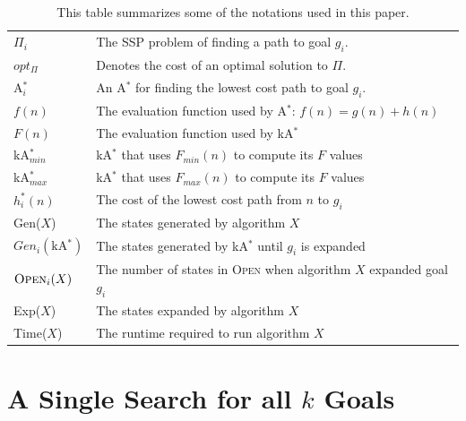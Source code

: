 \documentclass{aicom2e}
\newcommand{\astar}{A$^*$}
\newcommand{\kastar}{kA$^*$}
\newcommand{\kastarmin}{kA$^*_{min}$}
\newcommand{\kastarmax}{kA$^*_{max}$}
\newcommand{\astari}[1]{A$^*_#1$}
\newcommand{\minf}{$F_{min}(n)$}
\newcommand{\maxf}{$F_{max}(n)$}
\newcommand{\open}{\textsc{Open}}
\begin{document}
\begin{table}
    \scriptsize
\begin{tabular}{|m{1cm}|m{5.5cm}|}
        \hline
        $\Pi_i$     & The SSP problem of finding a path to goal $g_i$. \\
        $opt_\Pi$   & Denotes the cost of an optimal solution to $\Pi$.\\
        \astari{i}  & An \astar{} for finding the lowest cost path to goal $g_i$. \\
        $f(n)$      & The evaluation function used by \astar{}: $f(n)=g(n)+h(n)$ \\
        $F(n)$      & The evaluation function used by \kastar{} \\

        \kastarmin{} & \kastar{} that uses \minf{} to compute its $F$ values\\
        \kastarmax{} & \kastar{} that uses \maxf{} to compute its $F$ values\\
        $h^*_i(n)$ & The cost of the lowest cost path from $n$ to $g_i$\\
        Gen($X$)    & The states generated by algorithm $X$ \\
        $Gen_i(\text{\kastar{}})$ & The states generated by \kastar{} until $g_i$ is expanded \\
        $\open{}_i(X)$ & The number of states in \open{} when algorithm $X$ expanded goal $g_i$\\
        Exp($X$)    & The states expanded by algorithm $X$ \\
        Time($X$)   & The runtime required to run algorithm $X$ \\

        \hline
    \end{tabular}
\caption{This table summarizes some of the notations used in this paper.}
\label{tab:notations}
\end{table}


\section{A Single Search for all  $k$ Goals}
\label{sec:one-k-goal-search}
\end{document}
